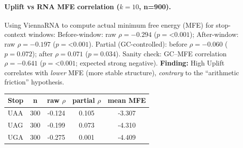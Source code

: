 \paragraph{Uplift vs RNA MFE correlation ($k=10$, n=900).}
Using ViennaRNA to compute actual minimum free energy (MFE) for stop-context windows:
Before-window: raw $\rho=-0.294$ ($p=$<$0.001$); After-window: raw $\rho=-0.197$ ($p=$<$0.001$).
Partial (GC-controlled): before $\rho=-0.060$ ($p=0.072$); after $\rho=0.071$ ($p=0.034$).
Sanity check: GC--MFE correlation $\rho=-0.641$ ($p=$<$0.001$; expected strong negative).
\textbf{Finding:} High Uplift correlates with \emph{lower} MFE (more stable structure), \emph{contrary} to the ``arithmetic friction'' hypothesis.
\begin{center}\small\begin{tabular}{lcccc}\toprule
Stop & n & raw $\rho$ & partial $\rho$ & mean MFE \\\midrule
UAA & 300 & -0.124 & 0.105 & -3.307 \\
UAG & 300 & -0.199 & 0.073 & -4.310 \\
UGA & 300 & -0.275 & 0.001 & -4.409 \\
\bottomrule\end{tabular}\end{center}

